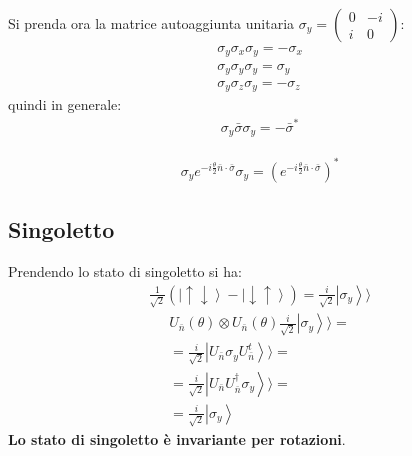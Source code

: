 Si prenda ora la matrice autoaggiunta unitaria $\sigma_y=\left(\begin{matrix}0&-i\\i&0\end{matrix}\right)$:
\begin{equation}\begin{split}
\sigma_y\sigma_x\sigma_y=-\sigma_x \\
\sigma_y\sigma_y\sigma_y=\sigma_y \\
\sigma_y\sigma_z\sigma_y=-\sigma_z
\end{split}\end{equation}
quindi in generale:
\begin{equation}\begin{split}
\sigma_y\bar \sigma\sigma_y=-\bar \sigma^*
\end{split}\end{equation}

\begin{equation}\begin{split}
\sigma_ye^{-i\frac{\theta}{2}\bar n\cdot \bar \sigma}\sigma_y=\left(e^{-i\frac{\theta}{2}\bar n\cdot \bar \sigma}\right)^*
\end{split}\end{equation}

\subsection{Singoletto} %
Prendendo lo stato di singoletto si ha:
\begin{equation}\begin{split}
\frac{1}{\sqrt{2}}\left(\left |\uparrow\downarrow \right\rangle-\left |\downarrow\uparrow \right\rangle\right)=\frac{i}{\sqrt{2}}\left |\sigma_y \right\rangle\rangle
\end{split}\end{equation}
\begin{equation}\begin{split}
U_{\bar n}\left(\theta\right)\otimes U_{\bar n}\left(\theta\right)\frac{i}{\sqrt{2}}\left |\sigma_y \right\rangle\rangle=\\
=\frac{i}{\sqrt{2}}\left |U_{\bar n}\sigma_yU_{\bar n}^t \right\rangle\rangle=\\
=\frac{i}{\sqrt{2}}\left |U_{\bar n}U_{\bar n}^{\dag}\sigma_y \right\rangle\rangle=\\
=\frac{i}{\sqrt{2}}\left |\sigma_y \right\rangle
\end{split}\end{equation}
\textbf{Lo stato di singoletto è invariante per rotazioni}.

